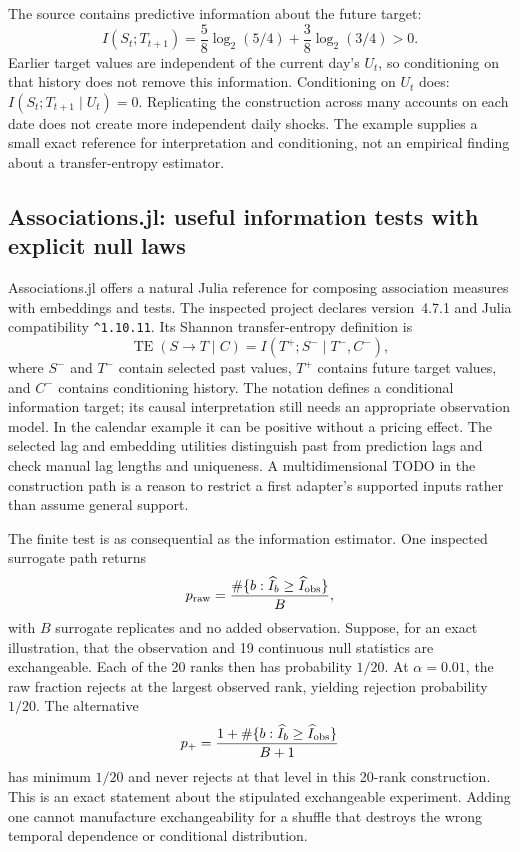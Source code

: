 The source contains predictive information about the future target:
\[
 I(S_t;T_{t+1})=
 \frac58\log_2(5/4)+\frac38\log_2(3/4)>0.
\]
Earlier target values are independent of the current day's $U_t$, so
conditioning on that history does not remove this information. Conditioning
on $U_t$ does: $I(S_t;T_{t+1}\mid U_t)=0$. Replicating the construction across
many accounts on each date does not create more independent daily shocks.
The example supplies a small exact reference for interpretation and
conditioning, not an empirical finding about a transfer-entropy estimator.
\citep{exec17_temporal_oracle}

\subsection{Associations.jl: useful information tests with explicit null laws}

Associations.jl offers a natural Julia reference for composing association
measures with embeddings and tests. The inspected project declares
version~4.7.1 and Julia compatibility \texttt{\^{}1.10.11}. Its Shannon
transfer-entropy definition is
\[
 \operatorname{TE}(S\to T\mid C)
       =I(T^+;S^-\mid T^-,C^-),
\]
where $S^-$ and $T^-$ contain selected past values, $T^+$ contains future
target values, and $C^-$ contains conditioning history. The notation defines
a conditional information target; its causal interpretation still needs an
appropriate observation model. In the calendar example it can be positive
without a pricing effect. The selected lag and embedding utilities distinguish
past from prediction lags and check manual lag lengths and uniqueness.
A multidimensional TODO in the construction path is a reason to restrict a
first adapter's supported inputs rather than assume general support.
\citep{exec17_temporal_associations}

The finite test is as consequential as the information estimator. One
inspected surrogate path returns
\[
 p_{\rm raw}=\frac{\#\{b:\widehat I_b\geq\widehat I_{\rm obs}\}}{B},
\]
with $B$ surrogate replicates and no added observation. Suppose, for an exact
illustration, that the observation and 19 continuous null statistics are
exchangeable. Each of the 20 ranks then has probability $1/20$. At
$\alpha=0.01$, the raw fraction rejects at the largest observed rank, yielding
rejection probability $1/20$. The alternative
\[
 p_+=\frac{1+\#\{b:\widehat I_b\geq\widehat I_{\rm obs}\}}{B+1}
\]
has minimum $1/20$ and never rejects at that level in this 20-rank construction.
This is an exact statement about the stipulated exchangeable experiment.
Adding one cannot manufacture exchangeability for a shuffle that destroys
the wrong temporal dependence or conditional distribution.
\citep{exec17_temporal_associations,exec17_temporal_oracle}

